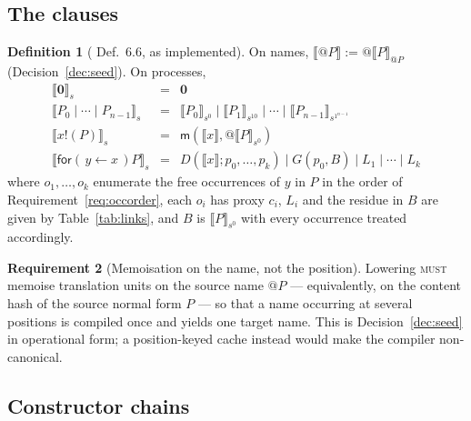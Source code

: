 \documentclass[11pt,a4paper]{article}
\makeatletter
\newcommand{\MUST}{\textsc{must}}
\newcommand{\quo}[1]{@#1}
\newcommand{\inp}[3]{\mathsf{for}(\,#1 \leftarrow #2\,)#3}
\newcommand{\out}[2]{#1!(#2)}
\newcommand{\nil}{\mathbf{0}}
\newcommand{\enc}[1]{\llbracket #1 \rrbracket}
\newcommand{\mm}{\mathsf{m}}
\theoremstyle{definition}
\newtheorem{definition}{Definition}[section]
\newtheorem{requirement}[definition]{Requirement}
\theoremstyle{plain}
\makeatother
\begin{document}
\subsection{The clauses}\label{sec:clauses}

\begin{definition}[\cite{draft3} Def.~6.6, as implemented]\label{def:trans}
On names, $\enc{\quo{P}} := \quo{\enc{P}_{\quo{P}}}$
(Decision~\ref{dec:seed}). On processes,
\[
\begin{array}{rcl}
  \enc{\nil}_{s} &=& \nil\\
  \enc{P_{0} \mid \cdots \mid P_{n-1}}_{s} &=&
     \enc{P_{0}}_{s^{0}} \mid \enc{P_{1}}_{s^{10}} \mid \cdots \mid
     \enc{P_{n-1}}_{s^{1^{n-1}}}\\
  \enc{\out{x}{P}}_{s} &=& \mm(\enc{x}, \quo{\enc{P}_{s^{0}}})\\
  \enc{\inp{y}{x}{P}}_{s} &=& D(\enc{x};p_{0},\dots,p_{k}) \mid
     G(p_{0},B) \mid L_{1} \mid \cdots \mid L_{k}
\end{array}
\]
where $o_{1},\dots,o_{k}$ enumerate the free occurrences of $y$ in $P$ in the
order of Requirement~\ref{req:occorder}, each $o_{i}$ has proxy $c_{i}$,
$L_{i}$ and the residue in $B$ are given by Table~\ref{tab:links}, and $B$ is
$\enc{P}_{s^{0}}$ with every occurrence treated accordingly.
\end{definition}

\begin{requirement}[Memoisation on the name, not the position]\label{req:memo}
Lowering \MUST{} memoise translation units on the source name $\quo{P}$ ---
equivalently, on the content hash of the source normal form $P$ --- so that a
name occurring at several positions is compiled once and yields one target
name. This is Decision~\ref{dec:seed} in operational form; a position-keyed
cache instead would make the compiler non-canonical.
\end{requirement}

\subsection{Constructor chains}\label{sec:chains}
\end{document}
